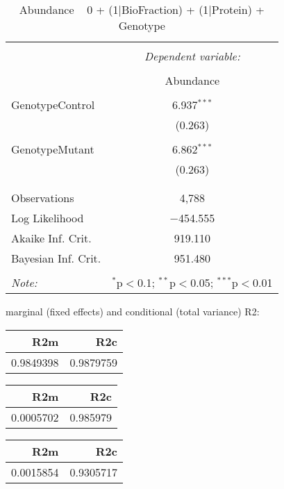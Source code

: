 \documentclass[11pt]{report}
\begin{document}
\begin{table}[!htbp] \centering 
  \caption{Abundance ~ 0 + (1|BioFraction) + (1|Protein) + Genotype} 
  \label{} 
\begin{tabular}{@{\extracolsep{5pt}}lc} 
\\[-1.8ex]\hline 
\hline \\[-1.8ex] 
 & \multicolumn{1}{c}{\textit{Dependent variable:}} \\ 
\cline{2-2} 
\\[-1.8ex] & Abundance \\ 
\hline \\[-1.8ex] 
 GenotypeControl & 6.937$^{***}$ \\ 
  & (0.263) \\ 
  & \\ 
 GenotypeMutant & 6.862$^{***}$ \\ 
  & (0.263) \\ 
  & \\ 
\hline \\[-1.8ex] 
Observations & 4,788 \\ 
Log Likelihood & $-$454.555 \\ 
Akaike Inf. Crit. & 919.110 \\ 
Bayesian Inf. Crit. & 951.480 \\ 
\hline 
\hline \\[-1.8ex] 
\textit{Note:}  & \multicolumn{1}{r}{$^{*}$p$<$0.1; $^{**}$p$<$0.05; $^{***}$p$<$0.01} \\ 
\end{tabular} 
\end{table} 
marginal (fixed effects) and conditional (total variance) R2:

\begin{tabular}{r|r}
\hline
R2m & R2c\\
\hline
0.9849398 & 0.9879759\\
\hline
\end{tabular}

\begin{tabular}{r|r}
\hline
R2m & R2c\\
\hline
0.0005702 & 0.985979\\
\hline
\end{tabular}

\begin{tabular}{r|r}
\hline
R2m & R2c\\
\hline
0.0015854 & 0.9305717\\
\hline
\end{tabular}
\end{document}
